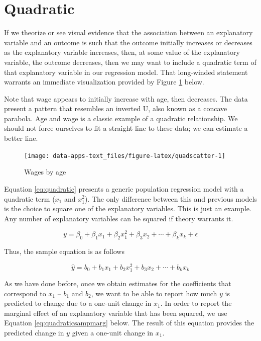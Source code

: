 \documentclass[
]{book}
\begin{document}
\hypertarget{quadratic}{%
\section{Quadratic}\label{quadratic}}

If we theorize or see visual evidence that the association between an explanatory variable and an outcome is such that the outcome initially increases or decreases as the explanatory variable increases, then, at some value of the explanatory variable, the outcome decreases, then we may want to include a quadratic term of that explanatory variable in our regression model. That long-winded statement warrants an immediate visualization provided by Figure \ref{fig:quadscatter} below.

Note that wage appears to initially increase with age, then decreases. The data present a pattern that resembles an inverted U, also known as a concave parabola. Age and wage is a classic example of a quadratic relationship. We should not force ourselves to fit a straight line to these data; we can estimate a better line.

\begin{figure}

{\centering \texttt{[image: data-apps-text\_files/figure-latex/quadscatter-1]} 

}

\caption{Wages by age}\label{fig:quadscatter}
\end{figure}

Equation \eqref{eq:quadratic} presents a generic population regression model with a quadratic term (\(x_1\) and \(x_1^2\)). The only difference between this and previous models is the choice to square one of the explanatory variables. This is just an example. Any number of explanatory variables can be squared if theory warrants it.

\begin{equation}
y = \beta_0 + \beta_1x_1 + \beta_2x_1^2 + \beta_3x_2 + \cdots + \beta_kx_k + \epsilon
\label{eq:quadratic}
\end{equation}

Thus, the sample equation is as follows

\begin{equation}
\hat{y} = b_0 + b_1x_1 + b_2x_1^2 + b_3x_2 + \cdots + b_kx_k
\label{eq:quadraticsamp}
\end{equation}

As we have done before, once we obtain estimates for the coefficients that correspond to \(x_1\) -- \(b_1\) and \(b_2\), we want to be able to report how much \(y\) is predicted to change due to a one-unit change in \(x_1\). In order to report the marginal effect of an explanatory variable that has been squared, we use Equation \eqref{eq:quadraticsampmarg} below. The result of this equation provides the predicted change in \(y\) given a one-unit change in \(x_1\).
\end{document}
